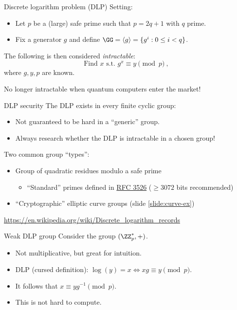 \begin{frame}{Discrete logarithm problem (DLP)}
  Setting:
  \begin{itemize}[<+(1)->]
    \item Let $p$ be a (large) safe prime such that $p = 2q + 1$ with $q$ prime.
    \item Fix a generator $g$ and define $\GG = \langle g \rangle = \{g^i :0 \le i < q\}$.
  \end{itemize}

  \vspace*{1em}

  \pause
  The following is then considered \emph{intractable}:
  \[
    \text{Find $x$ s.t. } g^x \equiv y \pmod{p}\ ,
  \]
  where $g, y, p$ are known.

  \pause
  No longer intractable when quantum computers enter the market!
\end{frame}

\begin{frame}{DLP security}
  The DLP exists in every finite cyclic group:
  \pause
  \begin{itemize}
    \item Not guaranteed to be hard in a \enquote{generic} group.
    \item Always research whether the DLP is intractable in a chosen group!
  \end{itemize}

  \vspace*{1em}

  \pause
  Two common group \enquote{types}:
  \begin{itemize}[<+(1)->]
    \item Group of quadratic residues modulo a safe prime
    \begin{itemize}
      \item \enquote{Standard} primes defined in \href{https://datatracker.ietf.org/doc/html/rfc3526}{RFC 3526} ($\ge3072$ bits recommended)
    \end{itemize}
    \item \enquote{Cryptographic} elliptic curve groups (slide \ref{slide:curve-ex})
  \end{itemize}

  \pause
  {\scriptsize\url{https://en.wikipedia.org/wiki/Discrete_logarithm_records}}
\end{frame}

\begin{frame}{Weak DLP group}
  Consider the group $(\ZZ_p^*, +)$.
  \begin{itemize}[<+(1)->]
    \item Not multiplicative, but great for intuition.
    \item DLP (cursed definition): $\log(y) = x \iff xg \equiv y \pmod{p}$.
    \item It follows that $x \equiv yg^{-1} \pmod{p}$.
    \item This is not hard to compute.
  \end{itemize}
\end{frame}

